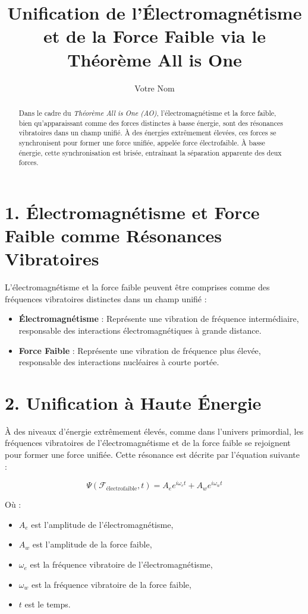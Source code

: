 \documentclass{article}
\title{Unification de l'Électromagnétisme et de la Force Faible via le Théorème All is One}
\author{Votre Nom}
\date{}
\begin{document}
\maketitle

\begin{abstract}
Dans le cadre du \textit{Théorème All is One (AO)}, l'électromagnétisme et la force faible, bien qu'apparaissant comme des forces distinctes à basse énergie, sont des résonances vibratoires dans un champ unifié. À des énergies extrêmement élevées, ces forces se synchronisent pour former une force unifiée, appelée force électrofaible. À basse énergie, cette synchronisation est brisée, entraînant la séparation apparente des deux forces.
\end{abstract}

\section{1. Électromagnétisme et Force Faible comme Résonances Vibratoires}

L'électromagnétisme et la force faible peuvent être comprises comme des fréquences vibratoires distinctes dans un champ unifié :
\begin{itemize}
    \item \textbf{Électromagnétisme} : Représente une vibration de fréquence intermédiaire, responsable des interactions électromagnétiques à grande distance.
    \item \textbf{Force Faible} : Représente une vibration de fréquence plus élevée, responsable des interactions nucléaires à courte portée.
\end{itemize}

\section{2. Unification à Haute Énergie}

À des niveaux d'énergie extrêmement élevés, comme dans l'univers primordial, les fréquences vibratoires de l'électromagnétisme et de la force faible se rejoignent pour former une force unifiée. Cette résonance est décrite par l'équation suivante :

\[
\Psi(\mathcal{F}_{\text{électrofaible}}, t) = A_e e^{i\omega_e t} + A_w e^{i\omega_w t}
\]

Où :
\begin{itemize}
    \item \( A_e \) est l'amplitude de l'électromagnétisme,
    \item \( A_w \) est l'amplitude de la force faible,
    \item \( \omega_e \) est la fréquence vibratoire de l'électromagnétisme,
    \item \( \omega_w \) est la fréquence vibratoire de la force faible,
    \item \( t \) est le temps.
\end{itemize}
\end{document}
